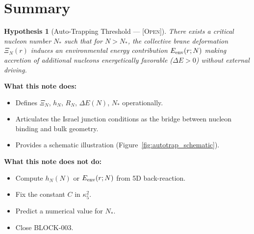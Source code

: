 \documentclass[11pt,a4paper]{article}
\newtheorem{hypothesis}{Hypothesis}
\newcommand{\Open}{\textsc{[Open]}}
\begin{document}
\section{Summary}

\begin{hypothesis}[Auto-Trapping Threshold --- \Open]
\label{hyp:autotrap}
There exists a critical nucleon number $N_*$ such that for $N > N_*$,
the collective brane deformation $\Xi_N(r)$ induces an environmental
energy contribution $E_{\rm env}(r; N)$ making accretion of additional
nucleons energetically favorable ($\Delta E > 0$) without external driving.
\end{hypothesis}

\textbf{What this note does:}
\begin{itemize}
\item Defines $\Xi_N$, $h_N$, $R_N$, $\Delta E(N)$, $N_*$ operationally.
\item Articulates the Israel junction conditions as the bridge between
nucleon binding and bulk geometry.
\item Provides a schematic illustration (Figure~\ref{fig:autotrap_schematic}).
\end{itemize}

\textbf{What this note does not do:}
\begin{itemize}
\item Compute $h_N(N)$ or $E_{\rm env}(r; N)$ from 5D back-reaction.
\item Fix the constant $C$ in $\kappa_5^2$.
\item Predict a numerical value for $N_*$.
\item Close BLOCK-003.
\end{itemize}
\end{document}
